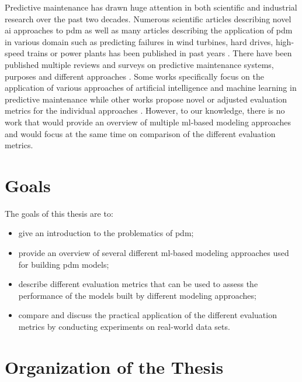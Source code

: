 \begin{introduction}
Predictive maintenance has drawn huge attention in both scientific and industrial research over the past two decades.
Numerous scientific articles describing novel \acrshort{ai} approaches to \acrshort{pdm} as well as many articles describing the application of \acrshort{pdm} in various domain such as predicting failures  in wind turbines, hard drives, high-speed trains or power plants has been published in past years \cite{yuan2019, peng2018novel, kauschke2016predicting, murray2005machine, prytz2014machine, liu2017svm, xiao2016probabilistic}.
There have been published multiple reviews and surveys on predictive maintenance  systems, purposes and different approaches \cite{lei2018machinery, zhang2019data, ran2019survey, lee2014prognostics, jia2018review}.
Some works specifically focus on the application of various approaches of artificial intelligence and machine learning in predictive maintenance \cite{jahnke2015machine, korvesis2017machine, tsui2015prognostics} while other works propose novel or adjusted evaluation metrics for the individual approaches \cite{saxena2010metrics, tatbul2018precision, kauschke2015challenges, weiss1998learning}.
However, to our knowledge, there is no work that would provide an overview of multiple \acrshort{ml}-based modeling approaches and would focus at the same time on comparison of the different evaluation metrics.

\section{Goals}

The goals of this thesis are to:
\begin{itemize}
    \item give an introduction to the problematics of \acrshort{pdm};
    \item provide an overview of several different \acrshort{ml}-based modeling approaches used for building \acrshort{pdm} models;
    \item describe different evaluation metrics that can be used to assess the performance of the models built by different modeling approaches; 
    \item compare and discuss the practical application of the different evaluation metrics by conducting experiments on real-world data sets.
\end{itemize}

\section{Organization of the Thesis}


\end{introduction}
